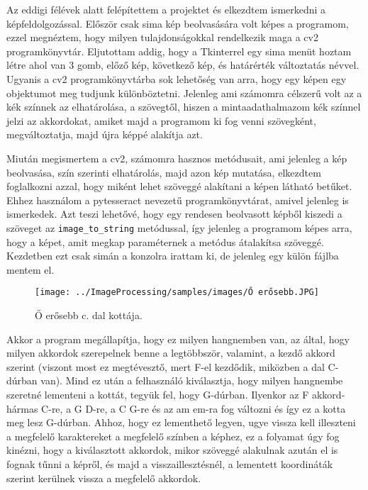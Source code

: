 
Az eddigi félévek alatt felépítettem a projektet és elkezdtem ismerkedni a képfeldolgozással. Először csak sima kép beolvasására volt képes a programom, ezzel megnéztem, hogy milyen tulajdonságokkal rendelkezik maga a cv2 programkönyvtár. Eljutottam addig, hogy a Tkinterrel egy sima menüt hoztam létre ahol van 3 gomb, előző kép, következő kép, és határérték változtatás névvel. Ugyanis a cv2 programkönyvtárba sok lehetőség van arra, hogy egy képen egy objektumot meg tudjunk különböztetni. Jelenleg ami számomra célszerű volt az a kék színnek az elhatárolása, a szövegtől, hiszen a mintaadathalmazom kék színnel jelzi az akkordokat, amiket majd a programom ki fog venni szövegként, megváltoztatja, majd újra képpé alakítja azt.
\par
Miután megismertem a cv2, számomra hasznos metódusait, ami jelenleg a kép beolvasása, szín szerinti elhatárolás, majd azon kép mutatása, elkezdtem foglalkozni azzal, hogy miként lehet szöveggé alakítani a képen látható betűket. Ehhez használom a pytesseract nevezetű programkönyvtárat, amivel jelenleg is ismerkedek. Azt teszi lehetővé, hogy egy rendesen beolvasott képből kiszedi a szöveget az \texttt{image\_to\_string} metódussal, így jelenleg a programom képes arra, hogy a képet, amit megkap paraméternek a metódus átalakítsa szöveggé. Kezdetben ezt csak simán a konzolra irattam ki, de jelenleg egy külön fájlba mentem el.

\begin{figure}[h]
	\texttt{[image: ../ImageProcessing/samples/images/Ő erősebb.JPG]}
	\caption{Ő erősebb c. dal kottája.}
	\label{fig:Dal1}
\end{figure}

\newpage
Akkor a program megállapítja, hogy ez milyen hangnemben van, az által, hogy milyen akkordok szerepelnek benne a legtöbbször, valamint, a kezdő akkord szerint (viszont most ez megtévesztő, mert F-el kezdődik, miközben a dal C-dúrban van). Mind ez után a felhasználó kiválasztja, hogy milyen hangnembe szeretné lementeni a kottát, tegyük fel, hogy G-dúrban. Ilyenkor az F akkord-hármas C-re, a G D-re, a C G-re és az am em-ra fog változni és így ez a kotta meg lesz G-dúrban. Ahhoz, hogy ez lementhető legyen, ugye vissza kell illeszteni a megfelelő karaktereket a megfelelő színben a képhez, ez a folyamat úgy fog kinézni, hogy a kiválasztott akkordok, mikor szöveggé alakulnak azután el is fognak tűnni a képről, és majd a visszaillesztésnél, a lementett koordináták szerint kerülnek vissza a megfelelő akkordok.